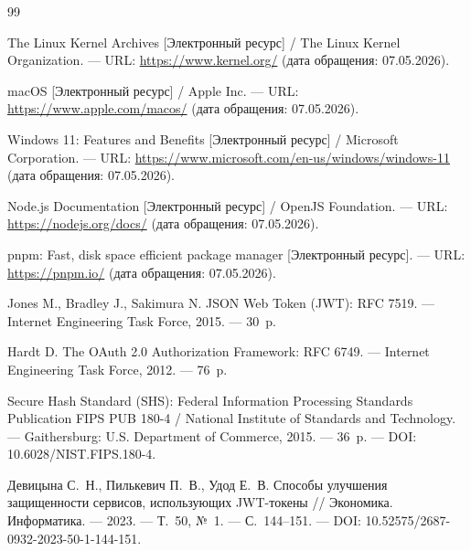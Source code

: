 \begin{thebibliography}{99}
      

      The Linux Kernel Archives [Электронный ресурс] /
      The Linux Kernel Organization. ---
      URL: \url{https://www.kernel.org/} (дата обращения: 07.05.2026).

      

      macOS [Электронный ресурс] / Apple Inc. ---
      URL: \url{https://www.apple.com/macos/} (дата обращения: 07.05.2026).

      

      Windows 11: Features and Benefits [Электронный ресурс] /
      Microsoft Corporation. ---
      URL: \url{https://www.microsoft.com/en-us/windows/windows-11} (дата обращения: 07.05.2026).

      

      Node.js Documentation [Электронный ресурс] / OpenJS Foundation. ---
      URL: \url{https://nodejs.org/docs/} (дата обращения: 07.05.2026).

      

      pnpm: Fast, disk space efficient package manager
      [Электронный ресурс]. ---
      URL: \url{https://pnpm.io/} (дата обращения: 07.05.2026).

      

      Jones M., Bradley J., Sakimura N.
      JSON Web Token (JWT): RFC 7519. ---
      Internet Engineering Task Force, 2015. --- 30~p.

      

      Hardt D.
      The OAuth 2.0 Authorization Framework: RFC 6749. ---
      Internet Engineering Task Force, 2012. --- 76~p.

      

      Secure Hash Standard (SHS): Federal Information Processing Standards
      Publication FIPS PUB 180-4 / National Institute of Standards
      and Technology. ---
      Gaithersburg: U.S. Department of Commerce, 2015. --- 36~p. ---
      DOI: 10.6028/NIST.FIPS.180-4.

      

      Девицына С.~Н., Пилькевич П.~В., Удод Е.~В.
      Способы улучшения защищенности сервисов, использующих JWT-токены //
      Экономика. Информатика. ---
      2023. --- Т.~50, №~1. --- С.~144--151. ---
      DOI: 10.52575/2687-0932-2023-50-1-144-151.

      


\end{thebibliography}

